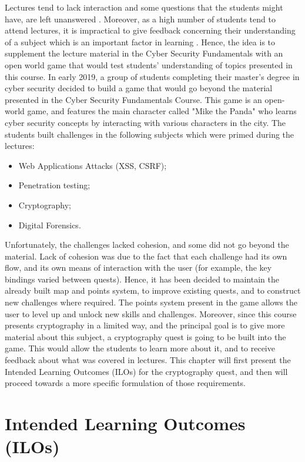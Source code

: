 \documentclass{l4proj}
\begin{document}
Lectures tend to lack interaction and some questions that the students might have, are left unanswered \citep{lehmann_theory-driven_2014}.
Moreover, as a high number of students tend to attend lectures, it is impractical to give feedback concerning their understanding of a subject 
which is an important factor in learning \citep{lehmann_theory-driven_2014}.
Hence, the idea is to supplement the lecture material in the Cyber Security Fundamentals with an open world game that would test students' understanding
of topics presented in this course.
In early 2019, a group of students completing their master's degree in cyber security decided to build a game that would go
beyond the material presented in the Cyber Security Fundamentals Course.
This game is an open-world game, and features the main character called "Mike the Panda" who learns cyber security concepts by
interacting with various characters in the city. 
The students built challenges in the following subjects which were primed during the lectures:
\begin{itemize}
    \item Web Applications Attacks (XSS, CSRF);
    \item Penetration testing;
    \item Cryptography;
    \item Digital Forensics.
\end{itemize}
Unfortunately, the challenges lacked cohesion, and some did not go beyond the material.
Lack of cohesion was due to the fact that each challenge had its own flow, and its own means of interaction with the user 
(for example, the key bindings varied between quests). 
Hence, it has been decided to maintain the already built map and points system, to improve existing quests, and to construct new challenges where required.
The points system present in the game allows the user to level up and unlock new skills and challenges.
Moreover, since this course presents cryptography in a limited way, and the principal goal is to give more material about this subject,
a cryptography quest is going to be built into the game. This would allow the students to learn more about it, 
and to receive feedback about what was covered in lectures.
This chapter will first present the Intended Learning Outcomes (ILOs) for the cryptography quest, and then will proceed towards a more specific 
formulation of those requirements.

\section{Intended Learning Outcomes (ILOs)}
\end{document}
